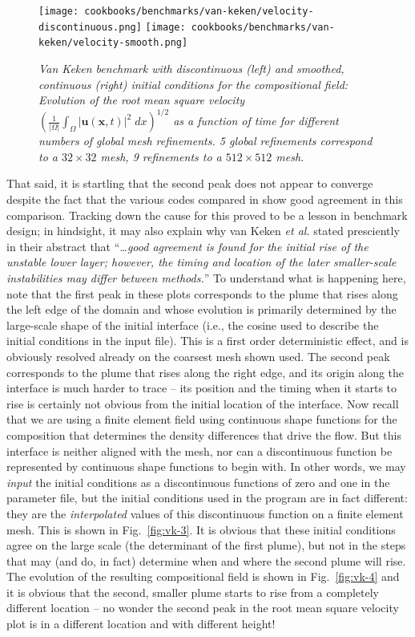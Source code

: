 \documentclass{article}
\begin{document}
\begin{figure}
  \texttt{[image: cookbooks/benchmarks/van-keken/velocity-discontinuous.png]}
  \hfill
  \texttt{[image: cookbooks/benchmarks/van-keken/velocity-smooth.png]}
  \caption{\it Van Keken benchmark with discontinuous (left) and smoothed,
  continuous (right) initial conditions for the compositional field:
  Evolution of the root mean square velocity $\left(\frac 1{|\Omega|}\int_\Omega |\mathbf u(\mathbf x,t)|^2 \;
  dx\right)^{1/2}$ as a function of time for different numbers of global mesh
  refinements. 5 global refinements correspond to a $32\times 32$ mesh, 9
  refinements to a $512\times 512$ mesh.}
  \label{fig:vk-2}
\end{figure}

That said, it is startling that the second peak does not appear to converge
despite the fact that the various codes compared in \cite{KKSCND97} show good
agreement in this comparison. Tracking down the cause for this proved to be a
lesson in benchmark design; in hindsight, it may also explain why van Keken
\textit{et al.} stated presciently in their abstract that ``\textit{\ldots good
agreement is found for the initial rise of the unstable lower layer; however, the timing
  and location of the later smaller-scale instabilities may differ between
  methods.}''
To understand what is happening here, note that the first peak in these plots
corresponds to the plume that rises along the left edge of the domain and whose
evolution is primarily determined by the large-scale shape of the initial
interface (i.e., the cosine used to describe the initial conditions in the
input file). This is a first order deterministic effect, and is obviously
resolved already on the coarsest mesh shown used. The second peak corresponds to
the plume that rises along the right edge, and its origin along the interface is
much harder to trace -- its position and the timing when it starts to rise is
certainly not obvious from the initial location of the interface. Now recall
that we are using a finite element field using continuous shape functions for
the composition that determines the density differences that drive the flow. But
this interface is neither aligned with the mesh, nor can a discontinuous
function be represented by continuous shape functions to begin with. In other
words, we may \textit{input} the initial conditions as a discontinuous functions
of zero and one in the parameter file, but the initial conditions used in the
program are in fact different: they are the \textit{interpolated} values of this
discontinuous function on a finite element mesh. This is shown in
Fig.~\ref{fig:vk-3}. It is obvious that these initial conditions agree on the
large scale (the determinant of the first plume), but not in the steps that may
(and do, in fact) determine when and where the second plume will rise. The
evolution of the resulting compositional field is shown in Fig.~\ref{fig:vk-4}
and it is obvious that the second, smaller plume starts to rise from a
completely different location -- no wonder the second peak in the root mean
square velocity plot is in a different location and with different height!
\end{document}
